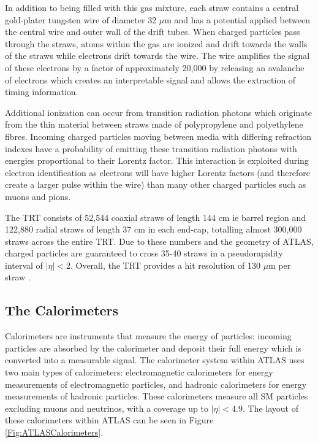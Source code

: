 \documentclass[12pt,a4paper,epsf,portrait,times,epsfig]{report}
\begin{document}
		In addition to being filled with this gas mixture, each straw contains a central gold-plater tungsten wire of diameter 32 $\mu$m and has a potential applied between the central wire and outer wall of the drift tubes. When charged particles pass through the straws, atoms within the gas are ionized and drift towards the walls of the straws while electrons drift towards the wire. The wire amplifies the signal of these electrons by a factor of approximately 20,000 by releasing an avalanche of electrons which creates an interpretable signal and allows the extraction of timing information. \par

		Additional ionization can occur from transition radiation photons which originate from the thin material between straws made of polypropylene and polyethylene fibres. Incoming charged particles moving between media with differing refraction indexes have a probability of emitting these transition radiation photons with energies proportional to their Lorentz factor. This interaction is exploited during electron identification as electrons will have higher Lorentz factors (and therefore create a larger pulse within the wire) than many other charged particles such as muons and pions. \par

		The TRT consists of 52,544 coaxial straws of length 144 cm ie barrel region and 122,880 radial straws of length 37 cm in each end-cap, totalling almost 300,000 straws across the entire TRT. Due to these numbers and the geometry of ATLAS, charged particles are guaranteed to cross 35-40 straws in a pseudorapidity interval of $|\eta| < 2$. Overall, the TRT provides a hit resolution of 130 $\mu$m per straw \cite{ATLASTRTRes}. 

		\subsection{The Calorimeters}\label{Section:Calorimeters}

		Calorimeters are instruments that measure the energy of particles: incoming particles are absorbed by the calorimeter and deposit their full energy which is converted into a measurable signal. The calorimeter system within ATLAS uses two main types of calorimeters: electromagnetic calorimeters for energy measurements of electromagnetic particles, and hadronic calorimeters for energy measurements of hadronic particles. These calorimeters measure all SM particles excluding muons and neutrinos, with a coverage up to $|\eta| < 4.9$. The layout of these calorimeters within ATLAS can be seen in Figure \ref{Fig:ATLASCalorimeters}. \par
\end{document}
